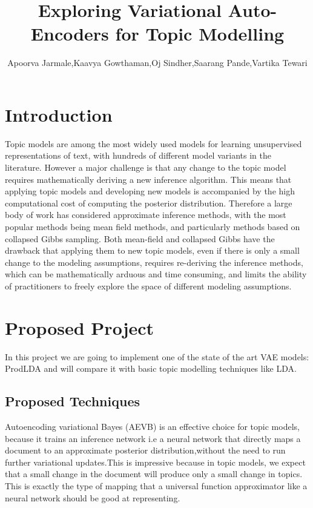\documentclass[12pt]{article}
\title{Exploring Variational Auto-Encoders for Topic Modelling}
\author{Apoorva Jarmale,Kaavya Gowthaman,Oj Sindher,Saarang Pande,Vartika Tewari}
\date{}
\begin{document}
\maketitle

\cite{20news}

\section{Introduction}

Topic models are among the most widely used models for learning unsupervised representations of text, with hundreds of different model variants in the literature. However a major challenge is that any change to the topic model requires mathematically deriving a new inference algorithm. This means that applying topic models and developing new models is accompanied by the high computational cost of computing the posterior distribution. Therefore a large body of work has considered approximate inference methods, with the most popular methods being mean field methods, and particularly methods based on collapsed Gibbs sampling. Both mean-field and collapsed Gibbs have the drawback that applying them to new topic models, even if there is only a small change to the modeling assumptions, requires re-deriving the inference methods, which can be mathematically arduous and time consuming, and limits the ability of practitioners to freely explore the space of different modeling assumptions.  \\

\section{Proposed Project}
In this project we are going to implement one of the state of the art VAE models: ProdLDA\cite{prodlda}  and will compare it with basic topic modelling techniques like LDA\cite{blei2003latent}. 

\subsection{Proposed Techniques }

Autoencoding variational Bayes (AEVB) is an effective choice for topic models, because it trains an inference network i.e a neural network that directly maps a document to an approximate posterior distribution,without the need to run further variational updates.This is impressive because in topic models, we expect that a small change in the document will produce only a small change in topics. This is exactly the type of mapping that a universal function approximator like a neural network should be good at representing. 
\end{document}
